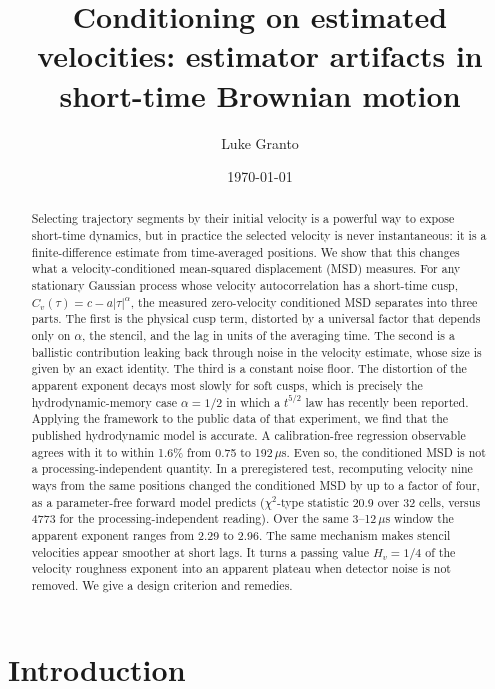 \documentclass[aps,pre,10pt,twocolumn,superscriptaddress,amsmath,amssymb]{revtex4-2}
\begin{document}
\title{Conditioning on estimated velocities: estimator artifacts in short-time Brownian motion}

\author{Luke Granto}

\date{\today}

\begin{abstract}
Selecting trajectory segments by their initial velocity is a powerful way to expose short-time dynamics, but in practice the selected velocity is never instantaneous: it is a finite-difference estimate from time-averaged positions. We show that this changes what a velocity-conditioned mean-squared displacement (MSD) measures. For any stationary Gaussian process whose velocity autocorrelation has a short-time cusp, $C_v(\tau)=c-a|\tau|^{\alpha}$, the measured zero-velocity conditioned MSD separates into three parts. The first is the physical cusp term, distorted by a universal factor that depends only on $\alpha$, the stencil, and the lag in units of the averaging time. The second is a ballistic contribution leaking back through noise in the velocity estimate, whose size is given by an exact identity. The third is a constant noise floor. The distortion of the apparent exponent decays most slowly for soft cusps, which is precisely the hydrodynamic-memory case $\alpha=1/2$ in which a $t^{5/2}$ law has recently been reported. Applying the framework to the public data of that experiment, we find that the published hydrodynamic model is accurate. A calibration-free regression observable agrees with it to within 1.6\% from 0.75 to 192\,$\mu$s. Even so, the conditioned MSD is not a processing-independent quantity. In a preregistered test, recomputing velocity nine ways from the same positions changed the conditioned MSD by up to a factor of four, as a parameter-free forward model predicts ($\chi^2$-type statistic 20.9 over 32 cells, versus 4773 for the processing-independent reading). Over the same 3--12\,$\mu$s window the apparent exponent ranges from 2.29 to 2.96. The same mechanism makes stencil velocities appear smoother at short lags. It turns a passing value $H_v=1/4$ of the velocity roughness exponent into an apparent plateau when detector noise is not removed. We give a design criterion and remedies.
\end{abstract}

\maketitle

\section{Introduction}
\end{document}
